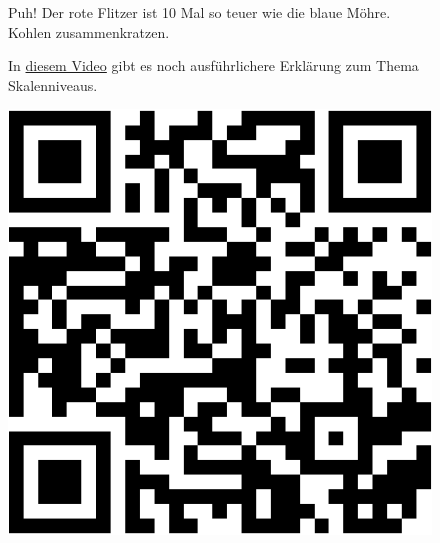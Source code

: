 \documentclass[
  letterpaper,
  oneside,
  open=any]{scrbook}
\theoremstyle{definition}
\theoremstyle{definition}
\theoremstyle{definition}
\theoremstyle{remark}
\begin{document}
\begin{figure}


\caption{\label{fig-verhaeltnis}Puh! Der rote Flitzer ist 10 Mal so
teuer wie die blaue Möhre. Kohlen zusammenkratzen.}

\end{figure}%

\begin{figure}

\begin{minipage}{0.80\linewidth}
In \href{https://www.youtube.com/watch?v=_mN3kFe56ng}{diesem Video} gibt
es noch ausführlichere Erklärung zum Thema Skalenniveaus.\end{minipage}%
%
\begin{minipage}{0.20\linewidth}

\begin{center}
\includegraphics[width=0.75\linewidth,height=\textheight,keepaspectratio]{010-rahmen_files/figure-pdf/qr-youtube-skalenniveaus-1.pdf}
\end{center}

\end{minipage}%

\end{figure}%
\end{document}
